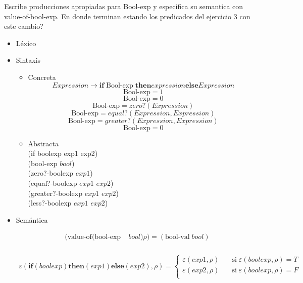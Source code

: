 \documentclass{article}
\begin{document}
\begin{enumerate}
    Escribe producciones apropiadas para Bool-exp y especifica su semantica con value-of-bool-exp. En donde terminan estando los predicados del ejercicio 3 con este cambio?

    \begin{itemize}
        \item Léxico \\
        \item Sintaxis 
        \begin{itemize}
            \item Concreta \\
        \[ Expression \to \textbf{if} \; \text{Bool-exp} \; \textbf{then} expression \textbf{else} Expression \]
        \[\text{Bool-exp} = 1\]
        \[\text{Bool-exp} = 0\]
        \[\text{Bool-exp} = zero?(Expression)\]
        \[\text{Bool-exp} = equal?(Expression, Expression)\]
        \[\text{Bool-exp} = greater?(Expression, Expression)\]
        \[\text{Bool-exp} = 0\]
            \item Abstracta \\
            (if boolexp exp1 exp2) \\
            (bool-exp $bool$)  \\
            (zero?-boolexp $exp1$)  \\
            (equal?-boolexp $exp1$ $exp2$)  \\
            (greater?-boolexp $exp1$ $exp2$) \\
            (less?-boolexp $exp1$ $exp2$) \\
        \end{itemize}
        \item Semántica 
        
        \begin{align*}
            (\text{value-of}(\text{bool-exp}& \; bool) \rho ) = (\text{bool-val} \; bool) \\
        \end{align*}


        \begin{align*}
        \varepsilon(\textbf{if}(boolexp)\textbf{then}(exp1)\textbf{else}(exp2),\rho)= \begin{cases}
       \varepsilon(exp1, \rho) &\quad\text{si} \; \varepsilon(boolexp, \rho) = T\\
       \varepsilon(exp2, \rho) &\quad\text{si} \; \varepsilon(boolexp, \rho) = F \\
     \end{cases}
        \end{align*}
    \end{itemize}


\end{enumerate}
\end{document}
